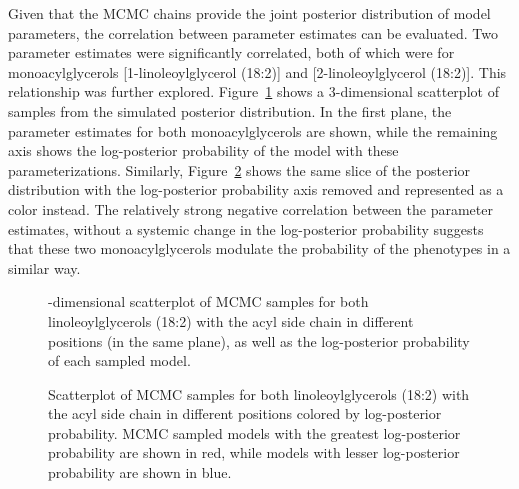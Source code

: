 \begin{DoubleSpace*}
Given that the MCMC chains provide the joint posterior distribution of model parameters, the correlation between parameter estimates can be evaluated. Two parameter estimates were significantly correlated, both of which were for monoacylglycerols [1-linoleoylglycerol (18:2)] and [2-linoleoylglycerol (18:2)]. This relationship was further explored. Figure~\ref{fig:coefPost} shows a 3-dimensional scatterplot of samples from the simulated posterior distribution. In the first plane, the parameter estimates for both monoacylglycerols are shown, while the remaining axis shows the log-posterior probability of the model with these parameterizations.  Similarly, Figure~\ref{fig:coefPost2} shows the same slice of the posterior distribution with the log-posterior probability axis removed and represented as a color instead. The relatively strong negative correlation between the parameter estimates, without a systemic change in the log-posterior probability suggests that these two monoacylglycerols modulate the probability of the phenotypes in a similar way. 

\begin{figure}[H]
	\caption[3-dimensional scatterplot of MCMC samples for both linoleoylglycerols (18:2) with the acyl side chain in different positions and the log-posterior probability of each sampled model]{-dimensional scatterplot of MCMC samples for both linoleoylglycerols (18:2) with the acyl side chain in different positions (in the same plane), as well as the log-posterior probability of each sampled model. \label{fig:coefPost} }
\end{figure}

\begin{figure}[H]
	\caption[Scatterplot of MCMC samples for both linoleoylglycerols (18:2) with the acyl side chain in different positions colored by log-posterior probability]{\DoubleSpacing Scatterplot of MCMC samples for both linoleoylglycerols (18:2) with the acyl side chain in different positions colored by log-posterior probability. MCMC sampled models with the greatest log-posterior probability are shown in red, while models with lesser log-posterior probability are shown in blue. \label{fig:coefPost2} }
\end{figure}


\end{DoubleSpace*}

